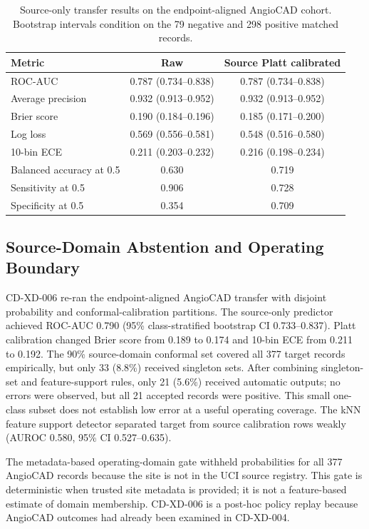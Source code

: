 \documentclass[journal]{IEEEtran}
\begin{document}
\begin{table}[t]
\centering
\caption{Source-only transfer results on the endpoint-aligned AngioCAD cohort.
Bootstrap intervals condition on the 79 negative and 298 positive matched
records.}
\label{tab:angiocad-transfer}
\begin{tabular}{lcc}
\toprule
Metric & Raw & Source Platt calibrated \\
\midrule
ROC-AUC & 0.787 (0.734--0.838) & 0.787 (0.734--0.838) \\
Average precision & 0.932 (0.913--0.952) & 0.932 (0.913--0.952) \\
Brier score & 0.190 (0.184--0.196) & 0.185 (0.171--0.200) \\
Log loss & 0.569 (0.556--0.581) & 0.548 (0.516--0.580) \\
10-bin ECE & 0.211 (0.203--0.232) & 0.216 (0.198--0.234) \\
Balanced accuracy at 0.5 & 0.630 & 0.719 \\
Sensitivity at 0.5 & 0.906 & 0.728 \\
Specificity at 0.5 & 0.354 & 0.709 \\
\bottomrule
\end{tabular}
\end{table}

\subsection{Source-Domain Abstention and Operating Boundary}
CD-XD-006 re-ran the endpoint-aligned AngioCAD transfer with disjoint
probability and conformal-calibration partitions. The source-only predictor
achieved ROC-AUC 0.790 (95\% class-stratified bootstrap CI 0.733--0.837).
Platt calibration changed Brier score from 0.189 to 0.174 and 10-bin ECE from
0.211 to 0.192. The 90\% source-domain conformal set covered all 377 target
records empirically, but only 33 (8.8\%) received singleton sets. After
combining singleton-set and feature-support rules, only 21 (5.6\%) received
automatic outputs; no errors were observed, but all 21 accepted records were
positive. This small one-class subset does not establish low error at a useful
operating coverage. The kNN feature
support detector separated target from source calibration rows weakly
(AUROC 0.580, 95\% CI 0.527--0.635).

The metadata-based operating-domain gate withheld probabilities for all 377
AngioCAD records because the site is not in the UCI source registry. This gate
is deterministic when trusted site metadata is provided; it is not a
feature-based estimate of domain membership. CD-XD-006 is a post-hoc policy
replay because AngioCAD outcomes had already been examined in CD-XD-004.
\end{document}
